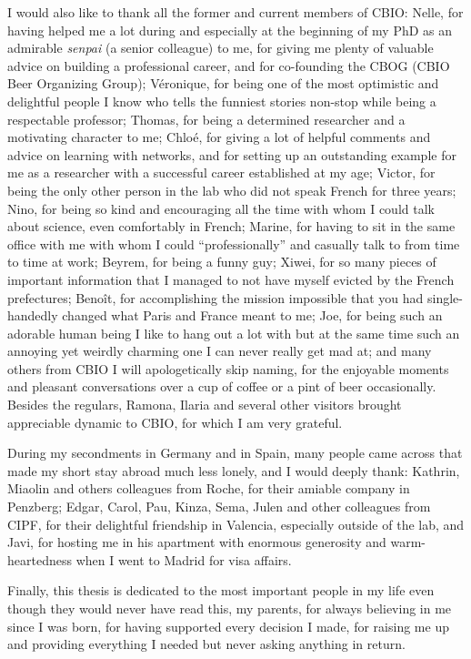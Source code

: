 I would also like to thank all the former and current members of CBIO: Nelle, for having helped me a lot during and especially at the beginning of my PhD as an admirable \textit{senpai} (a senior colleague) to me, for giving me plenty of valuable advice on building a professional career, and for co-founding the CBOG (CBIO Beer Organizing Group); V\'{e}ronique, for being one of the most optimistic and delightful people I know who tells the funniest stories non-stop while being a respectable professor; Thomas, for being a determined researcher and a motivating character to me; Chlo\'{e}, for giving a lot of helpful comments and advice on learning with networks, and for setting up an outstanding example for me as a researcher with a successful career established at my age; Victor, for being the only other person in the lab who did not speak French for three years; Nino, for being so kind and encouraging all the time with whom I could talk about science, even comfortably in French; Marine, for having to sit in the same office with me with whom I could ``professionally'' and casually talk to from time to time at work; Beyrem, for being a funny guy; Xiwei, for so many pieces of important information that I managed to not have myself evicted by the French prefectures; Beno\^{i}t, for accomplishing the mission impossible that you had single-handedly changed what Paris and France meant to me; Joe, for being such an adorable human being I like to hang out a lot with but at the same time such an annoying yet weirdly charming one I can never really get mad at; and many others from CBIO I will apologetically skip naming, for the enjoyable moments and pleasant conversations over a cup of coffee or a pint of beer occasionally. Besides the regulars, Ramona, Ilaria and several other visitors brought appreciable dynamic to CBIO, for which I am very grateful.


During my secondments in Germany and in Spain, many people came across that made my short stay abroad much less lonely, and I would deeply thank: Kathrin, Miaolin and others colleagues from Roche, for their amiable company in Penzberg; Edgar, Carol, Pau, Kinza, Sema, Julen and other colleagues from CIPF, for their delightful friendship in Valencia, especially outside of the lab, and Javi, for hosting me in his apartment with enormous generosity and warm-heartedness when I went to Madrid for visa affairs.


Finally, this thesis is dedicated to the most important people in my life even though they would never have read this, my parents, for always believing in me since I was born, for having supported every decision I made, for raising me up and providing everything I needed but never asking anything in return.



